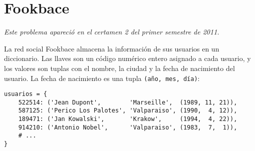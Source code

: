 \section{Fookbace}

\emph{Este problema apareció en el certamen 2 del primer semestre de
2011.}

La red social Fookbace almacena la información de sus usuarios en un
diccionario. Las llaves son un código numérico entero asignado a cada
usuario, y los valores son tuplas con el nombre, la ciudad y la fecha de
nacimiento del usuario. La fecha de nacimiento es una tupla
\lstinline!(año, mes, día)!:

\begin{lstlisting}
usuarios = {
    522514: ('Jean Dupont',        'Marseille',  (1989, 11, 21)),
    587125: ('Perico Los Palotes', 'Valparaiso', (1990,  4, 12)),
    189471: ('Jan Kowalski',       'Krakow',     (1994,  4, 22)),
    914210: ('Antonio Nobel',      'Valparaiso', (1983,  7,  1)),
    # ...
}
\end{lstlisting}

